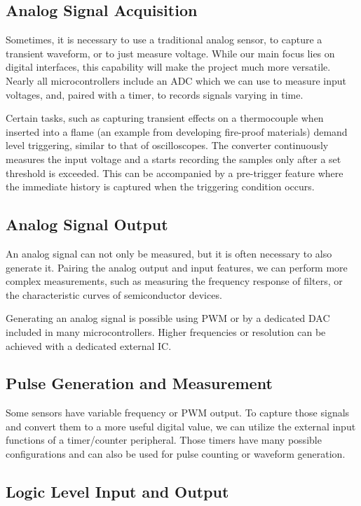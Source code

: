 \subsection{Analog Signal Acquisition}

Sometimes, it is necessary to use a traditional analog sensor, to capture a transient waveform, or to just measure voltage. While our main focus lies on digital interfaces, this capability will make the project much more versatile. Nearly all microcontrollers include an \gls{ADC} which we can use to measure input voltages, and, paired with a timer, to records signals varying in time.

Certain tasks, such as capturing transient effects on a thermocouple when inserted into a flame (an example from developing fire-proof materials) demand level triggering, similar to that of oscilloscopes. The converter continuously measures the input voltage and a starts recording the samples only after a set threshold is exceeded. This can be accompanied by a pre-trigger feature where the immediate history is captured when the triggering condition occurs.

\subsection{Analog Signal Output}

An analog signal can not only be measured, but it is often necessary to also generate it. Pairing the analog output and input features, we can perform more complex measurements, such as measuring the frequency response of filters, or the characteristic curves of semiconductor devices.

Generating an analog signal is possible using \gls{PWM} or by a dedicated \gls{DAC} included in many microcontrollers. Higher frequencies or resolution can be achieved with a dedicated external \gls{IC}.

\subsection{Pulse Generation and Measurement}

Some sensors have variable frequency or \gls{PWM} output. To capture those signals and convert them to a more useful digital value, we can utilize the external input functions of a timer/counter peripheral. Those timers have many possible configurations and can also be used for pulse counting or waveform generation.

\subsection{Logic Level Input and Output}

